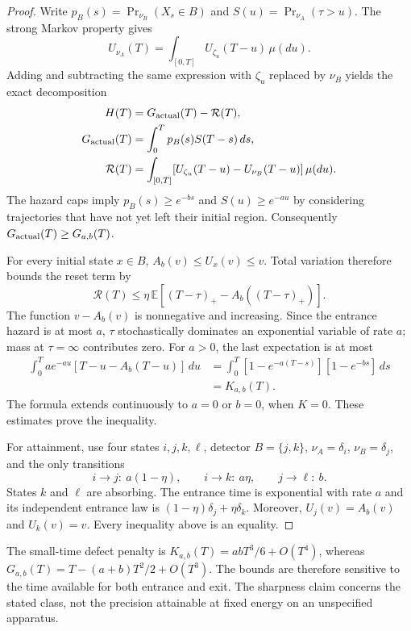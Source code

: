 \begin{proof}
Write $p_B(s)=\Pr_{\nu_B}(X_s\in B)$ and
$S(u)=\Pr_{\nu_A}(\tau>u)$. The strong Markov property gives
\[
 U_{\nu_A}(T)=\int_{[0,T]}U_{\zeta_u}(T-u)\,\mu(du).
\]
Adding and subtracting the same expression with $\zeta_u$ replaced by $\nu_B$
yields the exact decomposition
\begin{align*}
 H(T)&=G_{\rm actual}(T)-\mathcal R(T),\\
 G_{\rm actual}(T)&=\int_0^T p_B(s)S(T-s)\,ds,\\
 \mathcal R(T)&=\int_{[0,T]}
       [U_{\zeta_u}(T-u)-U_{\nu_B}(T-u)]\,\mu(du).
\end{align*}
The hazard caps imply $p_B(s)\geq e^{-bs}$ and $S(u)\geq e^{-au}$ by
considering trajectories that have not yet left their initial region.
Consequently $G_{\rm actual}(T)\geq G_{a,b}(T)$.

For every initial state $x\in B$,
$A_b(v)\leq U_x(v)\leq v$. Total variation therefore bounds the reset term by
\[
 \mathcal R(T)\leq
 \eta\,\mathbb E[(T-\tau)_+-A_b((T-\tau)_+)].
\]
The function $v-A_b(v)$ is nonnegative and increasing. Since the entrance
hazard is at most $a$, $\tau$ stochastically dominates an exponential variable
of rate $a$; mass at $\tau=\infty$ contributes zero. For $a>0$, the last
expectation is at most
\begin{align*}
 \int_0^T ae^{-au}[T-u-A_b(T-u)]\,du
 &=\int_0^T[1-e^{-a(T-s)}][1-e^{-bs}]\,ds\\
 &=K_{a,b}(T).
\end{align*}
The formula extends continuously to $a=0$ or $b=0$, when $K=0$.
These estimates prove the inequality.

For attainment, use four states $i,j,k,\ell$, detector $B=\{j,k\}$,
$\nu_A=\delta_i$, $\nu_B=\delta_j$, and the only transitions
\[
 i\longrightarrow j:\ a(1-\eta),\qquad
 i\longrightarrow k:\ a\eta,\qquad
 j\longrightarrow\ell:\ b.
\]
States $k$ and $\ell$ are absorbing. The entrance time is exponential with
rate $a$ and its independent entrance law is
$(1-\eta)\delta_j+\eta\delta_k$. Moreover,
$U_j(v)=A_b(v)$ and $U_k(v)=v$. Every inequality above is an equality.
\end{proof}

The small-time defect penalty is
$K_{a,b}(T)=abT^3/6+O(T^4)$, whereas
$G_{a,b}(T)=T-(a+b)T^2/2+O(T^3)$.
The bounds are therefore sensitive to the time available for both entrance and
exit. The sharpness claim concerns the stated class, not the precision attainable
at fixed energy on an unspecified apparatus.

